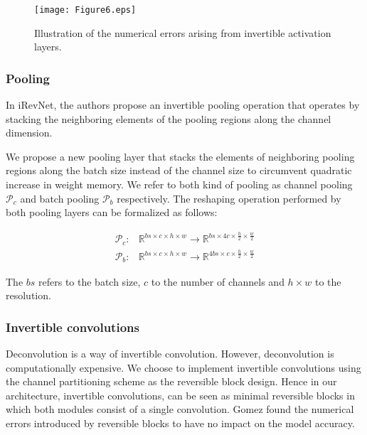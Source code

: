 \documentclass[10pt,twocolumn,letterpaper]{article}
\begin{document}
\begin{figure}[h]
\begin{center}
\texttt{[image: Figure6.eps]}
\end{center}
   \caption{Illustration of the numerical errors arising from invertible activation layers.}
\end{figure}

\subsubsection{Pooling}
In iRevNet, the authors propose an invertible pooling operation that operates by stacking the neighboring elements of the pooling regions along the channel dimension. 

We propose a new pooling layer that stacks the elements of neighboring pooling regions along the batch size instead of the channel size to circumvent quadratic increase in weight memory. 
We refer to both kind of pooling as channel pooling $\mathcal{P}_c$ and batch pooling $\mathcal{P}_b$ respectively. The reshaping operation performed by both pooling layers can be formalized as follows:

\begin{subequations}
\begin{align}
	\mathcal{P}_c :&  \mathbb{R}^{bs \times c \times h \times w}  \rightarrow \mathbb{R}^{bs \times 4c \times \frac{h}{2} \times \frac{w}{2}}\\
	\mathcal{P}_b :&  \mathbb{R}^{bs \times c \times h \times w}  \rightarrow \mathbb{R}^{4bs \times c \times \frac{h}{2} \times \frac{w}{2}}
\end{align}
\end{subequations}

The $bs$ refers to the batch size, $c$ to the number of channels and $h \times w$ to the resolution.
\subsubsection{Invertible convolutions}
Deconvolution is a way of invertible convolution. However, deconvolution is computationally expensive. We choose to implement invertible convolutions using the channel partitioning scheme as the reversible block design. Hence in our architecture, invertible convolutions, can be seen as minimal reversible blocks in which both modules consist of a single convolution. Gomez found the numerical errors introduced by reversible blocks to have no impact on the model accuracy.
\end{document}

